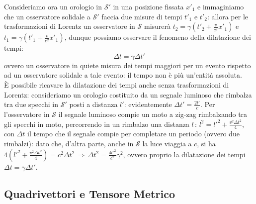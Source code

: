 Consideriamo ora un orologio in $ \mathcal{S}' $ in una posizione fissata $ x'_1 $ e immaginiamo che un osservatore solidale a $ \mathcal{S}' $ faccia due misure di tempi $ t'_1 $ e $ t'_2 $: allora per le trasformazioni di Lorentz un osservatore in $ \mathcal{S} $ misurerà $ t_2 = \gamma \left(t'_2 + \frac{v}{c^2} x'_1\right) $ e $ t_1 = \gamma \left(t'_1 + \frac{v}{c^2} x'_1\right) $, dunque possiamo osservare il fenomeno della dilatazione dei tempi:
\begin{equation}
	\Delta t = \gamma \Delta t'
	\label{eq:8}
\end{equation}
ovvero un osservatore in quiete misura dei tempi maggiori per un evento rispetto ad un osservatore solidale a tale evento: il tempo non è più un'entità assoluta. \\ 
%
È possibile ricavare la dilatazione dei tempi anche senza trasformazioni di Lorentz: consideriamo un orologio costituito da un segnale luminoso che rimbalza tra due specchi in $ \mathcal{S}' $ posti a distanza $ l' $: evidentemente $ \Delta t' = \frac{2l'}{c} $. Per l'osservatore in $ \mathcal{S} $ il segnale luminoso compie un moto a zig-zag rimbalzando tra gli specchi in moto, percorrendo in un rimbalzo una distanza $ l \,:\, l^2 = l'^2 + \frac{v^2 \Delta t^2}{4} $, con $ \Delta t $ il tempo che il segnale compie per completare un periodo (ovvero due rimbalzi): dato che, d'altra parte, anche in $ \mathcal{S} $ la luce viaggia a $ c $, si ha $ 4\left(l'^2 + \frac{v^2 \Delta t^2}{4}\right) = c^2 \Delta t^2 \, \Rightarrow \, \Delta t^2 = \frac{4l'^2}{c^2} \gamma^2 $, ovvero proprio la dilatazione dei tempi $ \Delta t = \gamma \Delta t' $.

\subsection{Quadrivettori e Tensore Metrico}

